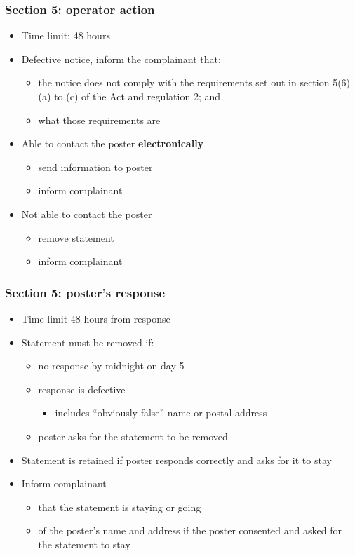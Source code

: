 \documentclass[ignorenonframetext,]{beamer}
\begin{document}
\begin{frame}
  \frametitle{Section 5: operator action}

  \begin{itemize}
  \item Time limit: 48 hours
  \item Defective notice, inform the complainant that:
\begin{itemize}
\item the notice does not comply with the requirements set out in section 5(6)(a) to (c) of the Act and regulation 2; and
\item what those requirements are
\end{itemize}
\item Able to contact the poster {\bf electronically}
  \begin{itemize}
  \item send information to poster
  \item inform complainant
  \end{itemize}
\item Not able to contact the poster
  \begin{itemize}
  \item remove statement
  \item inform complainant
  \end{itemize}

  \end{itemize}
\end{frame}

\begin{frame}
  \frametitle{Section 5: poster's response}
  \begin{itemize}
  \item Time limit 48 hours from response
  \item Statement must be removed if:
    \begin{itemize}
    \item no response by midnight on day 5
    \item response is defective
      \begin{itemize}
      \item includes ``obviously false'' name or postal address
      \end{itemize}
    \item poster asks for the statement to be removed
    \end{itemize}
  \item Statement is retained if poster responds correctly and asks for it to stay
  \item Inform complainant
    \begin{itemize}
    \item that the statement is staying or going
    \item of the poster's name and address if the poster consented and asked for the statement to stay
    \end{itemize}
  \end{itemize}
\end{frame}
\end{document}

